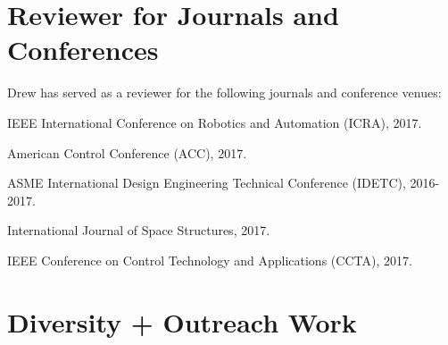 \documentclass[letterpaper]{deedy-resume} %
\begin{document}

\section{Reviewer for Journals and Conferences}

\vspace{0.2cm}

Drew has served as a reviewer for the following journals and conference venues:

\vspace{0.2cm}

\begin{tightitemize}

\item IEEE International Conference on Robotics and Automation (ICRA), 2017.

\item American Control Conference (ACC), 2017.

\item ASME International Design Engineering Technical Conference (IDETC), 2016-2017.

\item International Journal of Space Structures, 2017.

\item IEEE Conference on Control Technology and Applications (CCTA), 2017.

\end{tightitemize}



\section{Diversity + Outreach Work}

\vspace{0.2cm}
\end{document}
